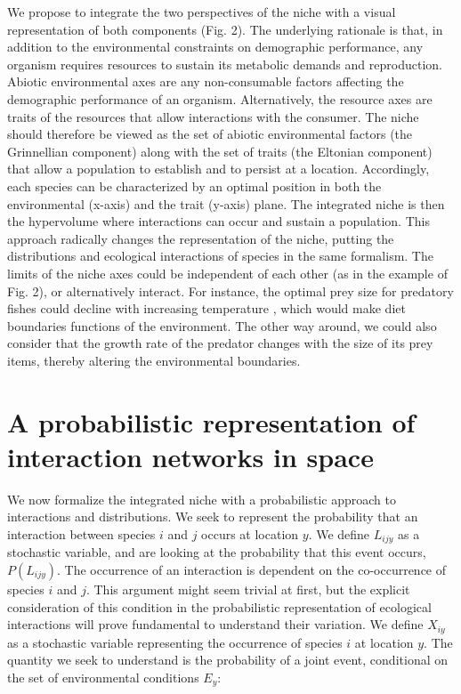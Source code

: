 \documentclass[12pt]{article}
\begin{document}
We propose to integrate the two perspectives of the niche with a visual
representation of both components (Fig. 2). The underlying rationale is that, in
addition to the environmental constraints on demographic performance, any
organism requires resources to sustain its metabolic demands and reproduction.
Abiotic environmental axes are any non-consumable factors affecting the
demographic performance of an organism. Alternatively, the resource axes are
traits of the resources that allow interactions with the consumer. The niche
should therefore be viewed as the set of abiotic environmental factors (the
Grinnellian component) along with the set of traits (the Eltonian component)
that allow a population to establish and to persist at a location. Accordingly,
each species can be characterized by an optimal position in both the
environmental (x-axis) and the trait (y-axis) plane. The integrated niche is
then the hypervolume where interactions can occur and sustain a population.
This approach radically changes the representation of the niche, putting the
distributions and ecological interactions of species in the same formalism.
The limits of the niche axes could be independent of each other (as in the
example of Fig. 2), or alternatively interact. For instance, the optimal
prey size for predatory fishes could decline with increasing temperature
\citep{Lelong2015}, which would make diet boundaries functions of the
environment. The other way around, we could also consider that the growth rate
of the predator changes with the size of its prey items, thereby altering the
environmental boundaries.

\section*{A probabilistic representation of interaction networks in space}

We now formalize the integrated niche with a probabilistic approach to
interactions and distributions. We seek to represent the probability that an
interaction between species $i$ and $j$ occurs at location $y$. We define
$L_{ijy}$ as a stochastic variable, and are looking at the probability that
this event occurs, $P(L_{ijy})$. The occurrence of an interaction is dependent
on the co-occurrence of species $i$ and $j$. This argument might seem trivial
at first, but the explicit consideration of this condition in the
probabilistic representation of ecological interactions will prove fundamental
to understand their variation. We define $X_{iy}$ as a stochastic variable
representing the occurrence of species $i$ at location $y$. The quantity we seek to
understand is the probability of a joint event, conditional on the set of
environmental conditions $E_y$:
\end{document}
